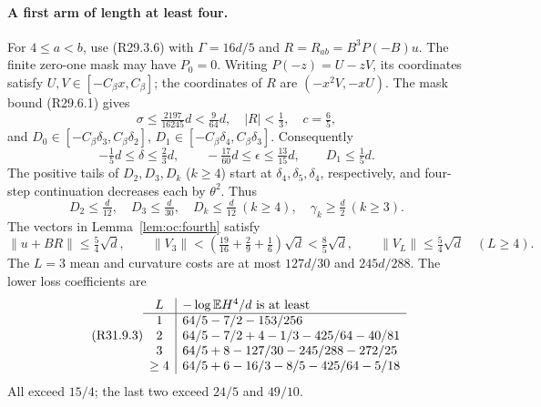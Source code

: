 \paragraph{A first arm of length at least four.}
For \(4\le a<b\), use (R29.3.6) with
\(\Gamma=16d/5\) and \(R=R_{ab}=B^3P(-B)u\). The finite
zero-one mask may have \(P_0=0\). Writing
\(P(-z)=U-zV\), its coordinates satisfy
\(U,V\in[-C_\beta x,C_\beta]\); the coordinates of \(R\) are
\((-x^2V,-xU)\). The mask bound (R29.6.1) gives
\[
 \sigma\le\tfrac{2197}{16245}d<\tfrac9{64}d,\quad
 |R|<\tfrac13,\quad c=\tfrac65,
\]
and \(D_0\in[-C_\beta\delta_3,C_\beta\delta_2]\),
\(D_1\in[-C_\beta\delta_4,C_\beta\delta_3]\). Consequently
\begin{equation}\tag{R31.9.1}\label{eq:oc:R31:9.1}
 -\tfrac15d\le\delta\le\tfrac23d,\qquad
 -\tfrac{17}{60}d\le\epsilon\le\tfrac{13}{15}d,\qquad D_1\le\tfrac15d.
\end{equation}
The positive tails of \(D_2,D_3,D_k\) (\(k\ge4\)) start at
\(\delta_4,\delta_5,\delta_4\), respectively, and four-step
continuation decreases each by \(\theta^2\). Thus
\begin{equation}\tag{R31.9.2}\label{eq:oc:R31:9.2}
 D_2\le\tfrac d{12},\quad D_3\le\tfrac d{30},\quad
 D_k\le\tfrac d{12}\ (k\ge4),\quad\gamma_k\ge\tfrac d2\ (k\ge3).
\end{equation}
The vectors in Lemma~\ref{lem:oc:fourth} satisfy
\[
 \|u+BR\|\le\tfrac54\sqrt d,\qquad
 \|V_3\|<(\tfrac{19}{16}+\tfrac29+\tfrac16)\sqrt d
 <\tfrac85\sqrt d,\qquad
 \|V_L\|\le\tfrac54\sqrt d\quad(L\ge4).
\]
The \(L=3\) mean and curvature costs are at most
\(127d/30\) and \(245d/288\). The lower loss coefficients are
\begin{equation}\tag{R31.9.3}\label{eq:oc:R31:9.3}
 \begin{array}{c|l}
 L&-\log\mathbb E H^4/d\ \text{is at least}\\\hline
 1&64/5-7/2-153/256\\
 2&64/5-7/2+4-1/3-425/64-40/81\\
 3&64/5+8-127/30-245/288-272/25\\
 \ge4&64/5+6-16/3-8/5-425/64-5/18
 \end{array}
\end{equation}
All exceed \(15/4\); the last two exceed \(24/5\) and \(49/10\).

